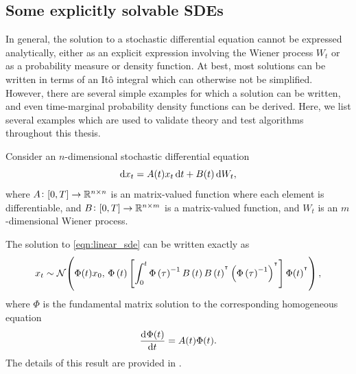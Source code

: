 \subsection{Some explicitly solvable SDEs}\label{sec:back_sde_solutions}
In general, the solution to a stochastic differential equation cannot be expressed analytically, either as an explicit expression involving the Wiener process \(W_t\) or as a probability measure or density function.
At best, most solutions can be written in terms of an It\^o integral which can otherwise not be simplified.
However, there are several simple examples for which a solution can be written, and even time-marginal probability density functions can be derived.
Here, we list several examples which are used to validate theory and test algorithms throughout this thesis.

\begin{example}
	Consider an \(n\)-dimensional stochastic differential equation
	\begin{equation}
		\sde{x_t}{A(t)x_t}{B(t)},
		\label{eqn:linear_sde}
	\end{equation}
	where \(A\colon [0,T] \to \mathbb{R}^{n\times n}\) is an matrix-valued function where each element is differentiable, and \(B\colon [0,T] \to \mathbb{R}^{n\times m}\) is a matrix-valued function, and \(W_t\) is an \(m\)-dimensional Wiener process.


	The solution to \eqref{eqn:linear_sde} can be written exactly as
	\[
		x_t \sim\mathcal{N}\!\left(\Phi(t) x_0, \, \Phi\left(t\right)\left[\int_0^t{\Phi\left(\tau\right)^{-1}B\left(t\right)B\left(t\right)^{^{\intercal}}\left(\Phi\left(\tau\right)^{-1}\right)^{^{\intercal}}}\right]\Phi(t)^{^{\intercal}}\right),
	\]
	where \(\Phi\) is the fundamental matrix solution to the corresponding homogeneous equation
	\[
		\dod{\Phi(t)}{t} = A(t)\Phi(t).
	\]
	The details of this result are provided in .

\end{example}

